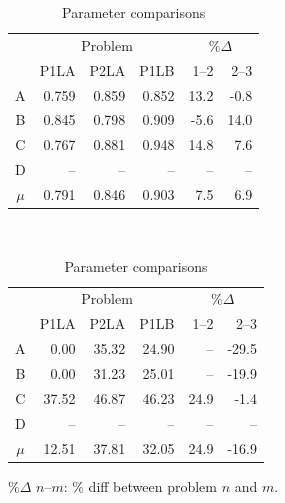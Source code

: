 \documentclass[a4paper,10pt]{article}
\begin{document}
\begin{table}[b]
  \centering
  
  \begin{threeparttable}
  \begin{subtable}{0.4\textwidth}
    \centering
    \begin{tabular}{|c|rrr|rr|}
      \hline
      \multicolumn{1}{|c|}{} & \multicolumn{3}{|c|}{Problem} & \multicolumn{2}{|c|}{$\%\Delta$} \\
      & P1LA & P2LA & P1LB & 1--2 & 2--3 \\ \cline{2-6}
      A & 0.759 & 0.859 & 0.852 & 13.2 & -0.8 \\
      B & 0.845 & 0.798 & 0.909 & -5.6 & 14.0 \\
      C & 0.767 & 0.881 & 0.948 & 14.8 & 7.6 \\
      D & -- & -- & -- & -- & -- \\ \hline
      $\mu$ & 0.791 & 0.846 & 0.903 & 7.5 & 6.9 \\ \hline
    \end{tabular}
    \caption{$b$ parameter comparison}
    \label{tab:tbcomp}
  \end{subtable}
  ~ \qquad
  \begin{subtable}{0.4\textwidth}
    \centering
    \begin{tabular}{|c|rrr|rr|}
      \hline
      \multicolumn{1}{|c|}{} & \multicolumn{3}{|c|}{Problem} & \multicolumn{2}{|c|}{$\%\Delta$} \\
      & P1LA & P2LA & P1LB & 1--2 & 2--3 \\ \cline{2-6}
A & 0.00 & 35.32 & 24.90 & -- & -29.5 \\
B & 0.00 & 31.23 & 25.01 & -- & -19.9 \\
C & 37.52 & 46.87 & 46.23 & 24.9 & -1.4 \\
D & -- & -- & -- & -- & -- \\ \hline
$\mu$ & 12.51 & 37.81 & 32.05 & 24.9 & -16.9 \\ \hline
    \end{tabular}
    \caption{$c$ parameter comparison}
    \label{tab:tccomp}
  \end{subtable}
  
  \begin{tablenotes}
   \item \small $\%\Delta$ $n$--$m$: \% diff between problem $n$ and $m$.
  \end{tablenotes}
  \end{threeparttable}

  \caption{Parameter comparisons}
\end{table}
\end{document}

